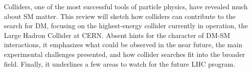 Colliders, one of the most successful tools of particle physics, have revealed much about SM matter.
This review will sketch how colliders can contribute to the search for DM, focusing on the highest-energy collider currently in operation, the Large Hadron Collider at CERN.
Absent hints for the character of DM-SM interactions, it emphasizes what could be observed in the near future, the main experimental challenges presented, and how collider searches fit into the broader field.
Finally, it underlines a few areas to watch for the future LHC program.








